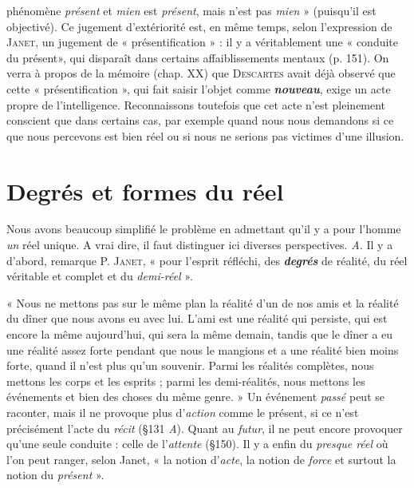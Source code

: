 phénomène {\it présent} et {\it mien} est {\it présent}, mais n’est pas {\it mien} » (puisqu’il
est objectivé). Ce jugement d’extériorité est, en même temps,
selon l’expression de \textsc{Janet}, un jugement de « présentification » : il
y a véritablement une « conduite du présent», qui disparaît dans certains
affaiblissements mentaux (p. 151). On verra à propos de la
mémoire (chap. XX) que \textsc{Descartes} avait déjà observé que cette « présentification »,
qui fait saisir l’objet comme \textbf{\textit {nouveau}}, exige un acte
propre de l'intelligence. Reconnaissons toutefois que cet acte n’est
pleinement conscient que dans certains cas, par exemple quand nous
nous demandons si ce que nous percevons est bien réel ou si nous
ne serions pas victimes d’une illusion.

\section{Degrés et formes du réel}%
Nous avons beaucoup simplifié
le problème en admettant qu’il y a pour l’homme {\it un} réel unique.
A vrai dire, il faut distinguer ici diverses perspectives. {\it A.} Il y a
d’abord, remarque P. \textsc{Janet}, « pour l’esprit réfléchi, des \textbf{\textit {degrés}} de réalité,
du réel véritable et complet et du {\it demi-réel} ».

« Nous ne mettons pas sur le même plan la réalité d’un de nos amis et la
réalité du dîner que nous avons eu avec lui. L’ami est une réalité qui persiste,
qui est encore la même aujourd’hui, qui sera la même demain, tandis
que le dîner a eu une réalité assez forte pendant que nous le mangions et a
une réalité bien moins forte, quand il n’est plus qu’un souvenir. Parmi les
réalités complètes, nous mettons les corps et les esprits ; parmi les demi-réalités,
nous mettons les événements et bien des choses du même genre. »
Un événement {\it passé} peut se raconter, mais il ne provoque plus d’\textsf{\textit {action}}
comme le présent, si ce n’est précisément l’acte du {\it récit} (\S 131 {\it A}). Quant au
{\it futur}, il ne peut encore provoquer qu’une seule conduite : celle de l'{\it attente}
(\S 150). Il y a enfin du \textsf{\textit {presque réel}} où l’on peut ranger, selon Janet, « la
notion d’{\it acte}, la notion de {\it force} et surtout la notion du {\it présent} ».

